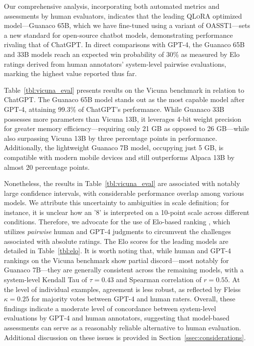Our comprehensive analysis, incorporating both automated metrics and assessments by human evaluators, indicates that the leading \textsc{QLoRA} optimized model—{Guanaco} 65B, which we have fine-tuned using a variant of OASST1—sets a new standard for open-source chatbot models, demonstrating performance rivaling that of ChatGPT. In direct comparisons with GPT-4, the {Guanaco} 65B and 33B models reach an expected win probability of 30\% as measured by Elo ratings derived from human annotators’ system-level pairwise evaluations, marking the highest value reported thus far.

Table~\ref{tbl:vicuna_eval} presents results on the Vicuna benchmark \cite{vicuna2023} in relation to ChatGPT. The {Guanaco} 65B model stands out as the most capable model after GPT-4, attaining 99.3\% of ChatGPT's performance. While {Guanaco} 33B possesses more parameters than Vicuna 13B, it leverages 4-bit weight precision for greater memory efficiency—requiring only 21 GB as opposed to 26 GB—while also surpassing Vicuna 13B by three percentage points in performance. Additionally, the lightweight {Guanaco} 7B model, occupying just 5 GB, is compatible with modern mobile devices and still outperforms Alpaca 13B by almost 20 percentage points.

Nonetheless, the results in Table~\ref{tbl:vicuna_eval} are associated with notably large confidence intervals, with considerable performance overlap among various models. We attribute this uncertainty to ambiguities in scale definition; for instance, it is unclear how an '8' is interpreted on a 10-point scale across different conditions. Therefore, we advocate for the use of Elo-based ranking \citep{elo1967proposed}, which utilizes \textit{pairwise} human and GPT-4 judgments to circumvent the challenges associated with absolute ratings. The Elo scores for the leading models are detailed in Table~\ref{tbl:elo}. It is worth noting that, while human and GPT-4 rankings on the Vicuna benchmark show partial discord—most notably for Guanaco 7B—they are generally consistent across the remaining models, with a system-level Kendall Tau of $\tau=0.43$ and Spearman correlation of $r=0.55$. At the level of individual examples, agreement is less robust, as reflected by Fleiss $\kappa=0.25$ for majority votes between GPT-4 and human raters. Overall, these findings indicate a moderate level of concordance between system-level evaluations by GPT-4 and human annotators, suggesting that model-based assessments can serve as a reasonably reliable alternative to human evaluation. Additional discussion on these issues is provided in Section~\ref{ssec:considerations}.

